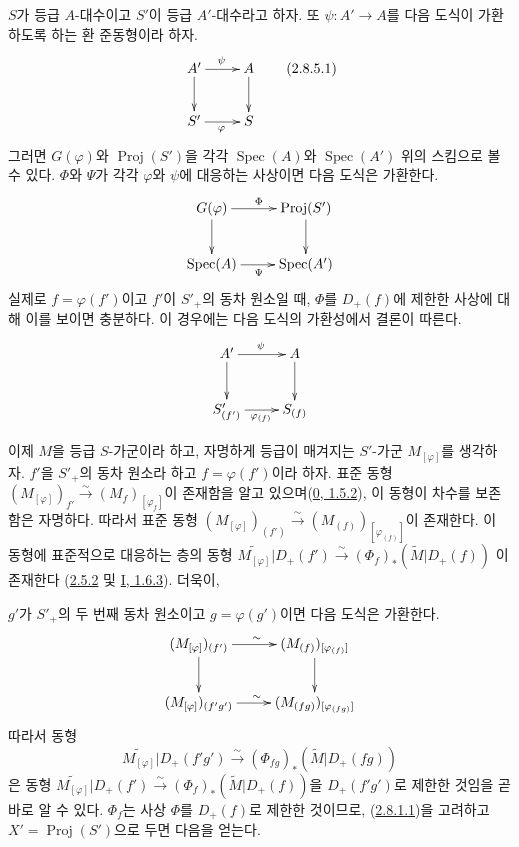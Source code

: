 \begin{env}[2.8.5]
\label{II.2.8.5-ko}
$S$가 등급 $A$-대수이고 $S'$이 등급 $A'$-대수라고 하자. 또
$\psi:A'\to A$를 다음 도식이 가환하도록 하는 환 준동형이라 하자.
\[
\label{II.2.8.5.1-ko}
  \xymatrix{
    A'\ar[r]^{\psi}\ar[d] & A\ar[d]\\
    S'\ar[r]_{\varphi} & S
  }
\tag{2.8.5.1}
\]
그러면 $G(\varphi)$와 $\operatorname{Proj}(S')$을 각각
$\operatorname{Spec}(A)$와 $\operatorname{Spec}(A')$ 위의 스킴으로 볼 수
있다. $\Phi$와 $\Psi$가 각각 $\varphi$와 $\psi$에 대응하는 사상이면
다음 도식은 가환한다.
\[
  \xymatrix{
    G(\varphi)\ar[r]^{\Phi}\ar[d] & \operatorname{Proj}(S')\ar[d]\\
    \operatorname{Spec}(A)\ar[r]_{\Psi} & \operatorname{Spec}(A')
  }
\]
실제로 $f=\varphi(f')$이고 $f'$이 $S'_+$의 동차 원소일 때, $\Phi$를
$D_+(f)$에 제한한 사상에 대해 이를 보이면 충분하다. 이 경우에는 다음
도식의 가환성에서 결론이 따른다.
\[
  \xymatrix{
    A'\ar[r]^{\psi}\ar[d] & A\ar[d]\\
    S'_{(f')}\ar[r]_{\varphi_{(f)}} & S_{(f)}
  }
\]
\end{env}

\begin{env}[2.8.6]
\label{II.2.8.6-ko}
이제 $M$을 등급 $S$-가군이라 하고, 자명하게 등급이 매겨지는
$S'$-가군 $M_{[\varphi]}$를 생각하자. $f'$을 $S'_+$의 동차 원소라 하고
$f=\varphi(f')$이라 하자. 표준 동형
$(M_{[\varphi]})_{f'}\xrightarrow{\sim}(M_f)_{[\varphi_f]}$이 존재함을
알고 있으며(\hyperref[0.1.5.2-ko]{0, 1.5.2}), 이 동형이 차수를
보존함은 자명하다. 따라서 표준 동형
$(M_{[\varphi]})_{(f')}\xrightarrow{\sim}
(M_{(f)})_{[\varphi_{(f)}]}$이 존재한다. 이 동형에 표준적으로 대응하는
층의 동형
$\widetilde{M_{[\varphi]}}|D_+(f')
\xrightarrow{\sim}(\Phi_f)_*(\widetilde{M}|D_+(f))$
이 존재한다
(\hyperref[II.2.5.2-ko]{2.5.2} 및
\hyperref[I.1.6.3-ko]{I, 1.6.3}). 더욱이,

$g'$가 $S'_+$의 두 번째 동차 원소이고 $g=\varphi(g')$이면 다음 도식은
가환한다.
\[
  \xymatrix{
    (M_{[\varphi]})_{(f')}\ar[r]^{\sim}\ar[d]
    & (M_{(f)})_{[\varphi_{(f)}]}\ar[d]\\
    (M_{[\varphi]})_{(f'g')}\ar[r]^{\sim}
    & (M_{(fg)})_{[\varphi_{(fg)}]}
  }
\]
따라서 동형
\[
  \widetilde{M_{[\varphi]}}|D_+(f'g')
  \xrightarrow{\sim}(\Phi_{fg})_*(\widetilde{M}|D_+(fg))
\]
은 동형
$\widetilde{M_{[\varphi]}}|D_+(f')
\xrightarrow{\sim}(\Phi_f)_*(\widetilde{M}|D_+(f))$을
$D_+(f'g')$로 제한한 것임을 곧바로 알 수 있다. $\Phi_f$는 사상
$\Phi$를 $D_+(f)$로 제한한 것이므로,
(\hyperref[II.2.8.1.1-ko]{2.8.1.1})을 고려하고
$X'=\operatorname{Proj}(S')$으로 두면 다음을 얻는다.
\end{env}

